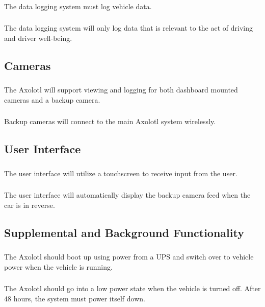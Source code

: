 \documentclass[onecolumn, draftclsnofoot,10pt, compsoc]{IEEEtran}
\begin{document}
\subsubsection{}
The data logging system must log vehicle data.
\subsubsection{}
The data logging system will only log data that is relevant to the act of driving and driver well-being.

\subsection{Cameras}
\subsubsection{}
The Axolotl will support viewing and logging for both dashboard mounted cameras and a backup camera.
\subsubsection{}
Backup cameras will connect to the main Axolotl system wirelessly.

\subsection{User Interface}
\subsubsection{}
The user interface will utilize a touchscreen to receive input from the user.
\subsubsection{}
The user interface will automatically display the backup camera feed when the car is in reverse.

\subsection{Supplemental and Background Functionality}
\subsubsection{}
The Axolotl should boot up using power from a UPS and switch over to vehicle power when the vehicle is running.
\subsubsection{}
The Axolotl should go into a low power state when the vehicle is turned off. After 48 hours, the system must power itself down.
\end{document}
